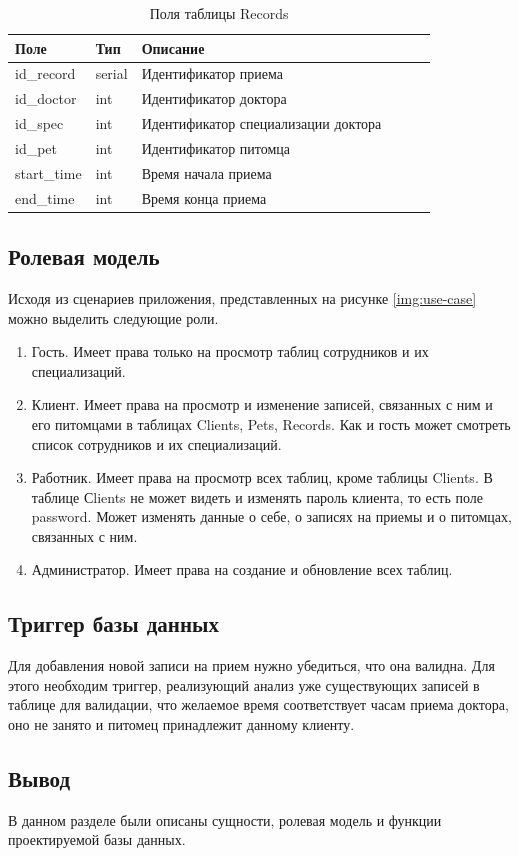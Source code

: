 \begin{table}[hbtp]
		\caption{\label{tab:records}Поля таблицы Records}
	\begin{center}
		\begin{tabular}{|l|l|l|l|l|l|}
			\hline {Поле} & {Тип} & {Описание}  \\ \hline
			id\_record  & serial & Идентификатор приема   \\ \hline
			id\_doctor & int & Идентификатор доктора  \\ \hline
			id\_spec & int & Идентификатор специализации доктора  \\ \hline
			id\_pet & int & Идентификатор питомца   \\ \hline
			start\_time & int & Время начала приема\\ \hline
			end\_time & int & Время конца приема\\ \hline
		\end{tabular}
	\end{center}
\end{table}

\pagebreak

\subsection{Ролевая модель}
Исходя из сценариев приложения, представленных на рисунке \ref{img:use-case} можно выделить следующие роли.
\begin{enumerate}[label=\arabic*)]
	\item Гость. Имеет права только на просмотр таблиц сотрудников и их специализаций.
	\item Клиент. Имеет права на просмотр и изменение записей, связанных с ним и его питомцами в таблицах Clients, Pets, Records. Как и гость может смотреть список сотрудников и их специализаций.
	\item Работник. Имеет права на просмотр всех таблиц, кроме таблицы Clients. В таблице Сlients не может видеть и изменять пароль клиента, то есть поле password. Может изменять данные о себе, о записях на приемы и о питомцах, связанных с ним.
	\item Администратор. Имеет права на создание и обновление всех таблиц.
\end{enumerate}

\subsection{Триггер базы данных}

Для добавления новой записи на прием нужно убедиться, что она валидна. Для этого необходим триггер, реализующий анализ уже существующих записей в таблице для валидации, что желаемое время соответствует часам приема доктора, оно не занято и питомец принадлежит данному клиенту.

\subsection*{Вывод}
В данном разделе были описаны сущности, ролевая модель и функции проектируемой базы данных.